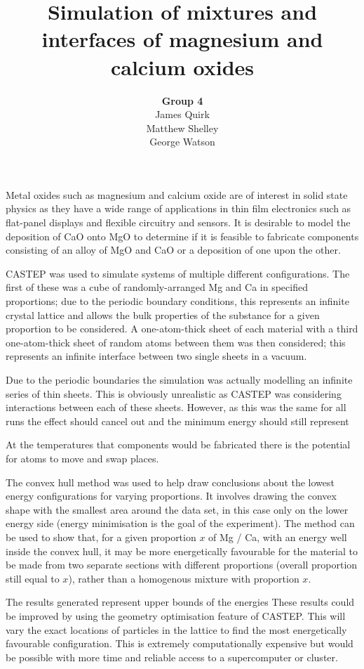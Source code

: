 \documentclass[a4paper,12pt]{article}
\title{Simulation of mixtures and interfaces of magnesium and calcium oxides}
\author{\textbf{Group 4}\\
	James Quirk\\
	Matthew Shelley\\
	George Watson}
\date{}
\begin{document}
\begin{multicols}{2}
	\maketitle
	
	Metal oxides such as magnesium and calcium oxide are of interest in solid state physics as they have a wide range of applications in thin film electronics such as flat-panel displays and flexible circuitry and sensors.\cite{kim2011lowtemperature} It is desirable to model the deposition of CaO onto MgO to determine if it is feasible to fabricate components consisting of an alloy of MgO and CaO or a deposition of one upon the other.
	
	CASTEP\cite{clark2009first} was used to simulate systems of multiple different configurations. The first of these was a cube of randomly-arranged Mg and Ca in specified proportions; due to the periodic boundary conditions, this represents an infinite crystal lattice and allows the bulk properties of the substance for a given proportion to be considered. A one-atom-thick sheet of each material with a third one-atom-thick sheet of random atoms between them was then considered; this represents an infinite interface between two single sheets in a vacuum.
	
	Due to the periodic boundaries the simulation was actually modelling an infinite series of thin sheets. This is obviously unrealistic as CASTEP was considering interactions between each of these sheets. However, as this was the same for all runs the effect should cancel out and the minimum energy should still represent 
	
	At the temperatures that components would be fabricated there is the potential for atoms to move and swap places.
	
	The convex hull method\cite{jarvis1973identification} was used to help draw conclusions about the lowest energy configurations for varying proportions. It involves drawing the convex shape with the smallest area around the data set, in this case only on the lower energy side (energy minimisation is the goal of the experiment). The method can be used to show that, for a given proportion $x$ of Mg / Ca, with an energy well inside the convex hull, it may be more energetically favourable for the material to be made from two separate sections with different proportions (overall proportion still equal to $x$), rather than a homogenous mixture with proportion $x$.
	

	The results generated represent upper bounds of the energies These results could be improved by using the geometry optimisation feature of CASTEP. This will vary the exact locations of particles in the lattice to find the most energetically favourable configuration. This is extremely computationally expensive but would be possible with more time and reliable access to a supercomputer or cluster.
	
\raggedright


\end{multicols}
\end{document}
